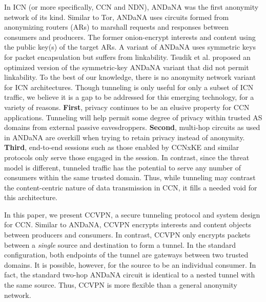 In ICN (or more specifically, CCN and NDN), ANDaNA was the first anonymity network of its
kind. Similar to Tor, ANDaNA uses circuits formed from anonymizing routers (ARs)
to marshall requests and responses between consumers and producers. The former
onion-encrypt interests and content using the public key(s) of the target ARs.
A variant of ANDaNA uses symmetric keys for packet encapsulation but suffers from
linkability. Tsudik et al. \cite{tsudik2016ac3n} proposed an optimized version of the symmetric-key
ANDaNA variant that did not permit linkability. To the best of our knowledge, there
is no anonymity network variant for ICN architectures. Though tunneling is only
useful for only a subset of ICN traffic, we believe it is a gap to be addressed
for this emerging technology, for a variety of reasons. {\bf First}, privacy
continues to be an elusive property for CCN applications. Tunneling will help
permit some degree of privacy within trusted AS domains from external passive
eavesdroppers. {\bf Second}, multi-hop circuits as used in ANDaNA are overkill
when trying to retain privacy instead of anonymity. {\bf Third}, end-to-end
sessions such as those enabled by CCNxKE \cite{ccnxke} and similar protocols
only serve those engaged in the session. In contrast, since the threat model is
different, tunneled traffic has the potential to serve any number of consumers
within the same trusted domain. Thus, while tunneling may contrast the content-centric
nature of data transmission in CCN, it fills a needed void for this architecture.

In this paper, we present CCVPN, a secure tunneling protocol and system design for
CCN. Similar to ANDaNA, CCVPN encrypts interests and content objects between producers
and consumers. In contrast, CCVPN only encrypts packets between a \emph{single}
source and destination to form a tunnel. In the standard configuration, both
endpoints of the tunnel are gateways between two trusted domains. It is possible,
however, for the source to be an individual consumer. In fact, the standard two-hop
ANDaNA circuit is identical to a nested tunnel with the same source. Thus,
CCVPN is more flexible than a general anonymity network.

